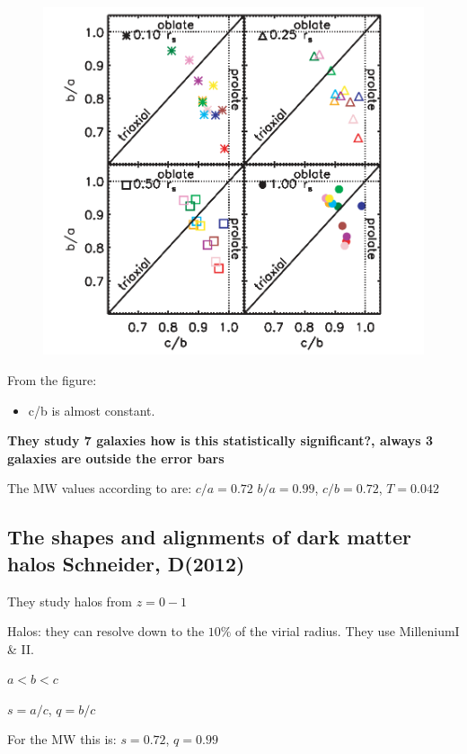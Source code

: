 \documentclass[12pt]{article}
\begin{document}
\begin{figure}[H]
\centering
\includegraphics[scale=0.5]{prolateoblatehayashi.png}
\end{figure}


From the figure:

\begin{itemize}
\item c/b is almost constant. 
\end{itemize}

\textbf{They study 7 galaxies how is this statistically significant?, always 3 galaxies are outside the error bars }

The MW values according to \citep{Law10} are: $c/a = 0.72$ $b/a = 0.99$, $c/b = 0.72$, $T=0.042$

\subsection{The shapes and alignments of dark matter halos Schneider, D(2012)}

They study halos from $z=0-1$

Halos: they can resolve down to the $10\%$ of the virial radius. They use MilleniumI \& II.

$a<b<c$

$s=a/c$, $q=b/c$
  
For the MW this is: $s = 0.72 $, $q = 0.99 $
\end{document}
